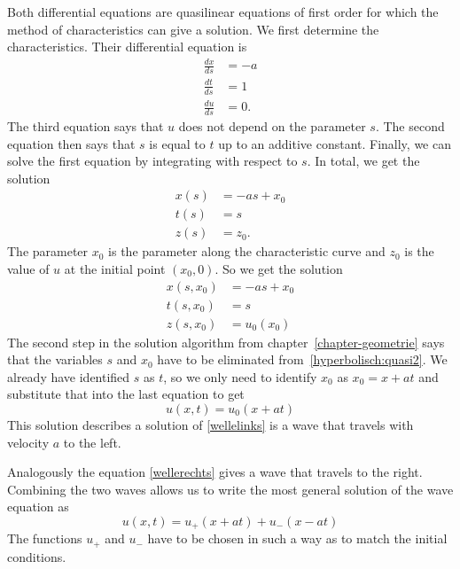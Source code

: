 Both differential equations are quasilinear equations of first order
for which the method of characteristics can give a solution.
We first determine the characteristics.
Their differential equation is
\begin{align*}
\frac{dx}{ds}&=-a
\\
\frac{dt}{ds}&=1
\\
\frac{du}{ds}&=0.
\end{align*}
The third equation says that $u$ does not depend on the parameter $s$.
The second equation then says that $s$ is equal to $t$ up to an additive
constant.
Finally, we can solve the first equation by integrating with respect to $s$.
In total, we get the solution
\begin{equation}
\begin{aligned}
x(s)&=-as+x_0\\
t(s)&=s\\
z(s)&=z_0.
\end{aligned}
\label{hyperbolisch:quasi1}
\end{equation}
The parameter $x_0$ is the parameter along the characteristic curve
and $z_0$ is the value of $u$ at the initial point $(x_0,0)$.
So we get the solution
\begin{equation}
\begin{aligned}
x(s,x_0)&=-as+x_0\\
t(s,x_0)&=s\\
z(s,x_0)&=u_0(x_0)
\end{aligned}
\label{hyperbolisch:quasi2}
\end{equation}
The second step in the solution algorithm from chapter~\ref{chapter-geometrie}
says that the variables $s$ and $x_0$ have to be eliminated
from~\eqref{hyperbolisch:quasi2}.
We already have identified $s$ as $t$, so we only need to identify
$x_0$ as $x_0=x+at$ and substitute that into the last equation to get
\begin{equation}
u(x,t) = u_0(x+at)
\label{hyperbolisch:quasi3}
\end{equation}
This solution describes a solution of \eqref{wellelinks}
is a wave that travels with velocity $a$ to the left.

Analogously the equation \eqref{wellerechts} gives a wave that
travels to the right.
Combining the two waves allows us to write the most general solution
of the wave equation as
\begin{equation}
u(x,t)=u_+(x+at)+u_-(x-at)
\label{dalembertloesung}
\end{equation}
The functions $u_+$ and $u_-$ have to be chosen in such a way as to
match the initial conditions.

